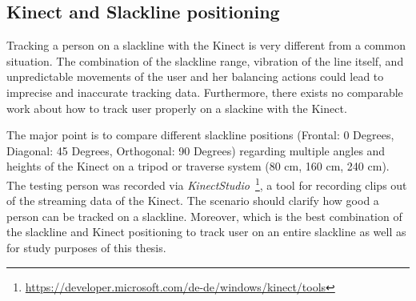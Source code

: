 \subsection{Kinect and Slackline positioning}\label{5_1_technicalFeasibility}
Tracking a person on a slackline with the Kinect is very different from a common situation.
The combination of the slackline range, vibration of the line itself, and unpredictable movements of the user and her balancing actions could lead to imprecise and inaccurate tracking data.
Furthermore, there exists no comparable work about how to track user properly on a slackine with the Kinect.

The major point is to compare different slackline positions (Frontal: 0 Degrees, Diagonal: 45 Degrees, Orthogonal: 90 Degrees) regarding multiple angles and heights of the Kinect on a tripod or traverse system (80 cm, 160 cm, 240 cm).
The testing person was recorded via \textit{KinectStudio}~\footnote{\url{https://developer.microsoft.com/de-de/windows/kinect/tools}}, a tool for recording clips out of the streaming data of the Kinect.
The scenario should clarify how good a person can be tracked on a slackline.
Moreover, which is the best combination of the slackline and Kinect positioning to track user on an entire slackline as well as for study purposes of this thesis.

